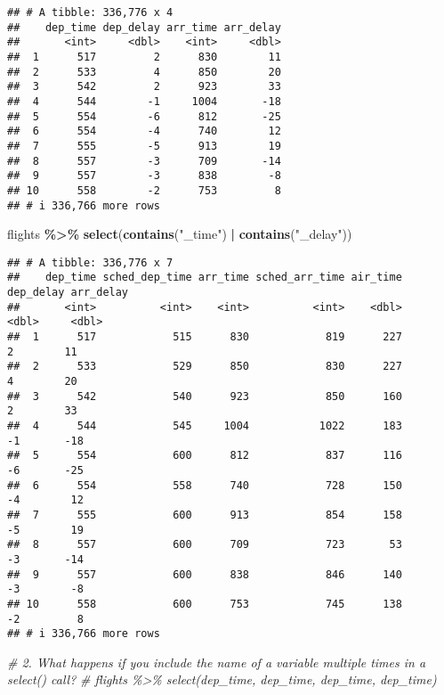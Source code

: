 \documentclass[
]{article}
\newenvironment{Shaded}{\begin{snugshade}}{\end{snugshade}}
\newcommand{\CommentTok}[1]{\textcolor[rgb]{0.56,0.35,0.01}{\textit{#1}}}
\newcommand{\FunctionTok}[1]{\textcolor[rgb]{0.13,0.29,0.53}{\textbf{#1}}}
\newcommand{\NormalTok}[1]{#1}
\newcommand{\SpecialCharTok}[1]{\textcolor[rgb]{0.81,0.36,0.00}{\textbf{#1}}}
\newcommand{\StringTok}[1]{\textcolor[rgb]{0.31,0.60,0.02}{#1}}
\begin{document}
\begin{verbatim}
## # A tibble: 336,776 x 4
##    dep_time dep_delay arr_time arr_delay
##       <int>     <dbl>    <int>     <dbl>
##  1      517         2      830        11
##  2      533         4      850        20
##  3      542         2      923        33
##  4      544        -1     1004       -18
##  5      554        -6      812       -25
##  6      554        -4      740        12
##  7      555        -5      913        19
##  8      557        -3      709       -14
##  9      557        -3      838        -8
## 10      558        -2      753         8
## # i 336,766 more rows
\end{verbatim}

\begin{Shaded}
\begin{Highlighting}[]
\NormalTok{flights }\SpecialCharTok{\%\textgreater{}\%} \FunctionTok{select}\NormalTok{(}\FunctionTok{contains}\NormalTok{(}\StringTok{"\_time"}\NormalTok{) }\SpecialCharTok{|} \FunctionTok{contains}\NormalTok{(}\StringTok{"\_delay"}\NormalTok{))}
\end{Highlighting}
\end{Shaded}

\begin{verbatim}
## # A tibble: 336,776 x 7
##    dep_time sched_dep_time arr_time sched_arr_time air_time dep_delay arr_delay
##       <int>          <int>    <int>          <int>    <dbl>     <dbl>     <dbl>
##  1      517            515      830            819      227         2        11
##  2      533            529      850            830      227         4        20
##  3      542            540      923            850      160         2        33
##  4      544            545     1004           1022      183        -1       -18
##  5      554            600      812            837      116        -6       -25
##  6      554            558      740            728      150        -4        12
##  7      555            600      913            854      158        -5        19
##  8      557            600      709            723       53        -3       -14
##  9      557            600      838            846      140        -3        -8
## 10      558            600      753            745      138        -2         8
## # i 336,766 more rows
\end{verbatim}

\begin{Shaded}
\begin{Highlighting}[]
\CommentTok{\# 2. What happens if you include the name of a variable multiple times in a select() call?}
\CommentTok{\# flights \%\textgreater{}\% select(dep\_time, dep\_time, dep\_time, dep\_time)}
\end{Highlighting}
\end{Shaded}
\end{document}
